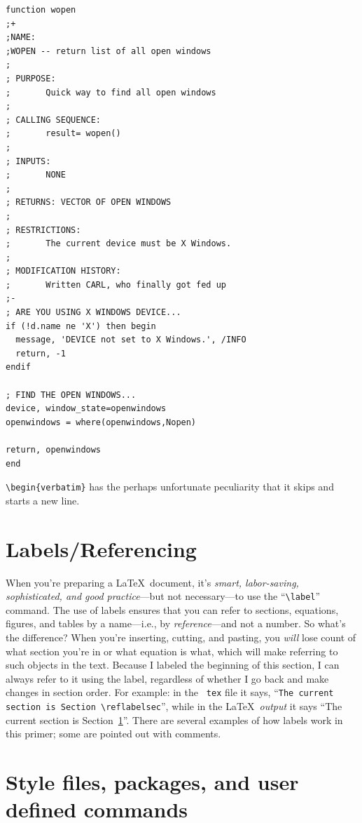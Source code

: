 \documentclass[12pt,preprint]{aastex}
\begin{document}
\begin{verbatim}
function wopen
;+
;NAME:
;WOPEN -- return list of all open windows
;
; PURPOSE:
;       Quick way to find all open windows
;
; CALLING SEQUENCE:
;       result= wopen()
;
; INPUTS:
;       NONE
;
; RETURNS: VECTOR OF OPEN WINDOWS
;
; RESTRICTIONS:
;       The current device must be X Windows.
;
; MODIFICATION HISTORY:
;       Written CARL, who finally got fed up
;-
; ARE YOU USING X WINDOWS DEVICE...
if (!d.name ne 'X') then begin
  message, 'DEVICE not set to X Windows.', /INFO
  return, -1
endif

; FIND THE OPEN WINDOWS...
device, window_state=openwindows
openwindows = where(openwindows,Nopen)

return, openwindows
end
\end{verbatim}

\noindent \verb$\begin{verbatim}$ has the perhaps unfortunate
peculiarity that it skips and starts a new line.

\section{Labels/Referencing}\label{labelsec}

When you're preparing a \LaTeX\ document, it's {\it smart, labor-saving,
  sophisticated, and good practice}---but not necessary---to use the
``\verb&\label&'' command.  The use of labels ensures that you can refer
to sections, equations, figures, and tables by a name---i.e., by {\it
  reference}---and not a number.  So what's the difference? When you're
inserting, cutting, and pasting, you {\it will} lose count of what
section you're in or what equation is what, which will make referring to
such objects in the text.  Because I labeled the beginning of this
section, I can always refer to it using the label, regardless of whether
I go back and make changes in section order.  For example: in the {\tt
  tex} file it says, ``{\tt The current section is
  Section~\verb&\&ref{labelsec}}'', while in the \LaTeX\ {\it output} it
says ``The current section is Section~\ref{labelsec}''.
There are several examples of how labels work in this primer; some are
pointed out with comments. 

\section{Style files, packages, and user defined commands}\label{stylesec}
\end{document}
